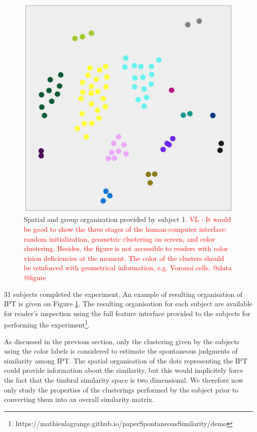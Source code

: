 \documentclass{article}
\makeatletter
\newcommand*{\eg}{e.g.\@\xspace}
\newcommand{\ipt}{IPT\xspace}
\newcommand{\vl}[1]{\textcolor{red}{VL : #1}}
\makeatother
\begin{document}
\begin{figure}
\center
\includegraphics[width = \textwidth]{figures/xp2example.png}
\caption{Spatial and group organization provided by subject 1.
\vl{It would be good to show the three stages of the human-computer interface:
random initialization,
geometric clustering on screen,
and color clustering.
Besides, the figure is not accessible to readers with
color vision deficiencies at the moment.
The color of the clusters should be reinforced with
geometrical information, \eg{} Voronoi cells.
@data @figure}}
\label{fig:xp2display}
\end{figure}

31 subjects completed the experiment. An example of resulting organisation of \ipt is given on Figure \ref{fig:xp2display}. The resulting organisation for each subject are available for reader's inspection using the full feature interface provided to the subjects for performing the experiment\footnote{https://mathieulagrange.github.io/paperSpontaneousSimilarity/demo}.

As discussed in the previous section, only the clustering given by the subjects using the color labels is considered to estimate the spontaneous judgments of similarity among \ipt. The spatial organisation of the dots representing the \ipt could provide information about the similarity, but this would implicitely force the fact that the timbral similarity space is two dimensional. We therefore now only study the properties of the clusterings performed by the subject prior to converting them into an overall similarity matrix.
\end{document}
